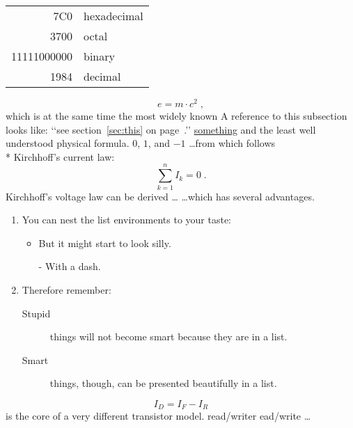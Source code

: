 \documentclass[a4paper,11pt]{article}
\begin{document}
\begin{tabular}{|r|l|}
\hline
7C0 & hexadecimal \\
3700 & octal \\ \cline{2-2}
11111000000 & binary \\
\hline \hline
1984 & decimal \\
\hline
\end{tabular}


\begin{equation}
e = m \cdot c^2 \; ,
\end{equation}
which is at the same time the most widely known
A reference to this subsection
\label{sec:this} looks like:
‘‘see section~\ref{sec:this} on
page~\pageref{sec:this}.’’ \underline{something}
and the least well understood physical formula. $0$, $1$, and $-1$
\ldots from which follows\\* Kirchhoff’s current law:
\begin{equation}
\sum_{k=1}^{n} I_k = 0 \; .
\end{equation}
Kirchhoff’s voltage law can be derived \ldots
\ldots which has several advantages.
\flushleft
\begin{enumerate}
\item You can nest the list
environments to your taste:
\begin{itemize}
\item But it might start to
look silly.
\item[-] With a dash.
\end{itemize}
\item Therefore remember:
\begin{description}
\item[Stupid] things will not
become smart because they are
in a list.
\item[Smart] things, though,
can be presented beautifully
in a list.
\end{description}
\end{enumerate}
\begin{equation}
I_D = I_F - I_R
\end{equation}
is the core of a very different transistor model. read/writer  ead\slash write
  \ldots 
\end{document}
